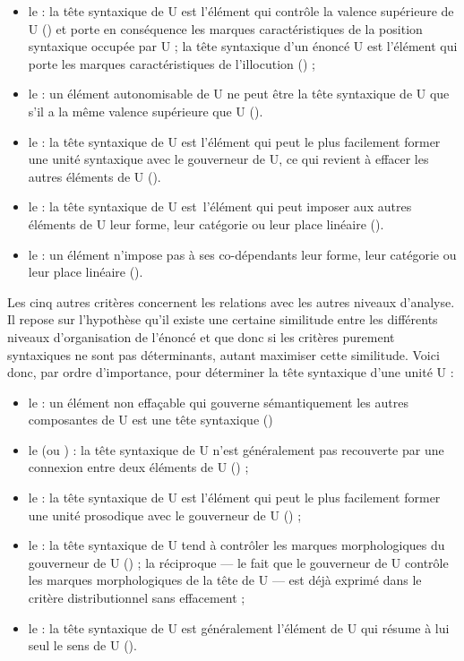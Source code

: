\begin{itemize}
\item le  : la tête syntaxique de U est l’élément qui contrôle la valence supérieure de U () et porte en conséquence les marques caractéristiques de la position syntaxique occupée par U ; la tête syntaxique d’un énoncé U est l’élément qui porte les marques caractéristiques de l’illocution () ;
\item le : un élément autonomisable de U ne peut être la tête syntaxique de U que s’il a la même valence supérieure que U ().
\item le   : la tête syntaxique de U est l’élément qui peut le plus facilement former une unité syntaxique avec le gouverneur de U, ce qui revient à effacer les autres éléments de U ().
\item le  : la tête syntaxique de U est~l’élément qui peut imposer aux autres éléments de U leur forme, leur catégorie ou leur place linéaire ().
\item le  : un élément n'impose pas à ses co-dépendants leur forme, leur catégorie ou leur place linéaire ().
\end{itemize}

Les cinq autres critères concernent les relations avec les autres niveaux d’analyse. Il repose sur l’hypothèse qu’il existe une certaine similitude entre les différents niveaux d’organisation de l’énoncé et que donc si les critères purement syntaxiques ne sont pas déterminants, autant maximiser cette similitude. Voici donc, par ordre d’importance,  pour déterminer la tête syntaxique d’une unité U :

\begin{itemize}
\item le  : un élément non effaçable qui gouverne sémantiquement les autres composantes de U est une tête syntaxique ()
\item le  (ou ) : la tête syntaxique de U n’est généralement pas recouverte par une connexion entre deux éléments de U () ;
\item le  : la tête syntaxique de U est l’élément qui peut le plus facilement former une unité prosodique avec le gouverneur de U () ;
\item le  : la tête syntaxique de U tend à contrôler les marques morphologiques du gouverneur de U () ; la réciproque — le fait que le gouverneur de U contrôle les marques morphologiques de la tête de U — est déjà exprimé dans le critère distributionnel sans effacement ;
\item le  : la tête syntaxique de U est généralement l’élément de U qui résume à lui seul le sens de U ().
\end{itemize}

